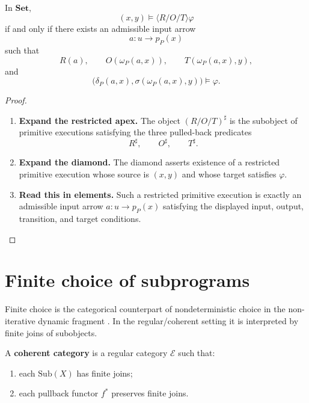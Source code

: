 \begin{proposition}
\label{prop:relative-restricted-primitive-reading}
In \(\mathbf{Set}\),
\[
(x,y)\models \langle R/O/T\rangle\varphi
\]
if and only if there exists an admissible input arrow
\[
a:u\to p_P(x)
\]
such that
\[
R(a),
\qquad
O(\omega_P(a,x)),
\qquad
T(\omega_P(a,x),y),
\]
and
\[
\bigl(
\delta_P(a,x),
\sigma(\omega_P(a,x),y)
\bigr)
\models\varphi.
\]
\end{proposition}

\begin{proof}
\leavevmode
\begin{enumerate}
\item \textbf{Expand the restricted apex.}
The object \((R/O/T)^\sharp\) is the subobject of primitive executions
satisfying the three pulled-back predicates
\[
R^\sharp,\qquad O^\sharp,\qquad T^\sharp.
\]

\item \textbf{Expand the diamond.}
The diamond asserts existence of a restricted primitive execution whose source
is \((x,y)\) and whose target satisfies \(\varphi\).

\item \textbf{Read this in elements.}
Such a restricted primitive execution is exactly an admissible input arrow
\(a:u\to p_P(x)\) satisfying the displayed input, output, transition, and
target conditions.
\end{enumerate}
\end{proof}

\section{Finite choice of subprograms}
\label{sec:relative-finite-choice}

Finite choice is the categorical counterpart of nondeterministic choice in
the non-iterative dynamic fragment \cite{HarelKozenTiurynDynamicLogic}. In the
regular/coherent setting it is interpreted by finite joins of subobjects.

\begin{definition}
\label{def:relative-coherent-category}
A \textbf{coherent category} is a regular category \(\mathcal E\) such that:
\begin{enumerate}
\item each \(\mathrm{Sub}(X)\) has finite joins;
\item each pullback functor \(f^\ast\) preserves finite joins.
\end{enumerate}
\end{definition}

